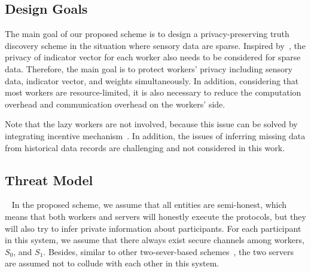 \documentclass[conference]{IEEEtran}
\begin{document}
\subsection{Design Goals}
The main goal of our proposed scheme is to design a privacy-preserving truth discovery scheme in the situation where sensory data are sparse.
Inspired by~\cite{wang_sparse_2020}, the privacy of indicator vector for each worker also needs to be considered for sparse data.
Therefore, the main goal is to protect workers' privacy including sensory data, indicator vector, and weights simultaneously.
In addition, considering that most workers are resource-limited, it is also necessary to reduce the computation overhead and communication overhead on the workers' side.

Note that the lazy workers are not involved, because this issue can be solved by integrating incentive mechanism~\cite{xue_inpptd_2020}.
In addition, the issues of inferring missing data from historical data records are challenging and not considered in this work.

\subsection{Threat Model}~\label{sub:threat}
In the proposed scheme, we assume that all entities are semi-honest, which means that both workers and servers will honestly execute the protocols, but they will also try to infer private information about participants.
For each participant in this system, we assume that there always exist secure channels among workers, $S_0$, and $S_1$.
Besides, similar to other two-sever-based schemes~\cite{zhang_reliable_2019,xue_two-cloud_2017}, the two servers are assumed not to collude with each other in this system.

\end{document}
